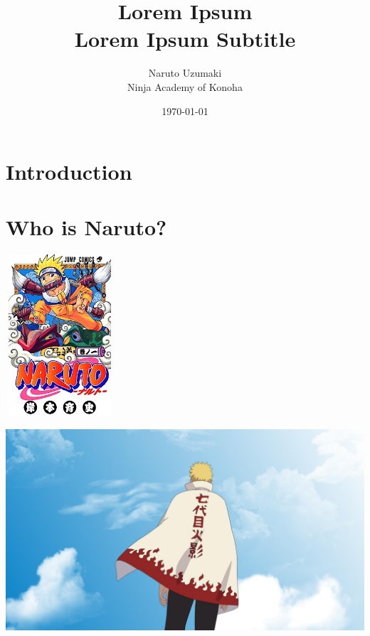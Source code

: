 \documentclass[11pt]{article}
\title{Lorem Ipsum\\\tiny Lorem Ipsum Subtitle}
\author{Naruto Uzumaki\\\tiny Ninja Academy of Konoha}
\date{\today}
\begin{document}
	\maketitle

	\section{Introduction}
		\blindtext
		\blindtext

	\section{Who is Naruto?}
		\includegraphics[height=6cm, width=4cm]{images/NarutoCoverTankobon1.jpg}

		\includegraphics{images/sjuCDTP.jpg}
\end{document}
